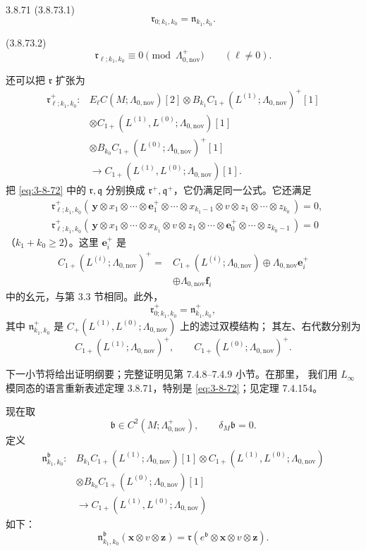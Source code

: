 \begin{theorem}{3.8.71}
\noindent\textup{(3.8.73.1)}
\[
 \mathfrak r_{0;k_1,k_0}=\mathfrak n_{k_1,k_0}.
\]

\noindent\textup{(3.8.73.2)}
\[
 \mathfrak r_{\ell;k_1,k_0}
 \equiv0\pmod{\Lambda^+_{0,\mathrm{nov}}}
 \qquad(\ell\ne0).
\]

还可以把 $\mathfrak r$ 扩张为
\[
\begin{aligned}
 \mathfrak r^+_{\ell;k_1,k_0}\colon&
 E_\ell C(M;\Lambda_{0,\mathrm{nov}})[2]
 \otimes
 B_{k_1}C_{1+}(L^{(1)};\Lambda_{0,\mathrm{nov}})^+[1]\\
 &\otimes
 C_{1+}(L^{(1)},L^{(0)};\Lambda_{0,\mathrm{nov}})[1]\\
 &\otimes
 B_{k_0}C_{1+}(L^{(0)};\Lambda_{0,\mathrm{nov}})^+[1]\\
 &\longrightarrow
 C_{1+}(L^{(1)},L^{(0)};\Lambda_{0,\mathrm{nov}})[1].
\end{aligned}
\]
把 \eqref{eq:3-8-72} 中的 $\mathfrak r,\mathfrak q$ 分别换成
$\mathfrak r^+,\mathfrak q^+$，它仍满足同一公式。它还满足
\[
\begin{aligned}
 &\mathfrak r^+_{\ell;k_1,k_0}
 (\,\mathbf y\otimes x_1\otimes\cdots\otimes
 \mathbf e_1^+\otimes\cdots\otimes x_{k_1-1}
 \otimes v\otimes z_1\otimes\cdots\otimes z_{k_0}\,)
 =0,\\
 &\mathfrak r^+_{\ell;k_1,k_0}
 (\,\mathbf y\otimes x_1\otimes\cdots\otimes x_{k_1}
 \otimes v\otimes z_1\otimes\cdots\otimes
 \mathbf e_0^+\otimes\cdots\otimes z_{k_0-1}\,)
 =0
\end{aligned}
\]
（$k_1+k_0\geq2$）。这里 $\mathbf e_i^+$ 是
\[
\begin{aligned}
 C_{1+}(L^{(i)};\Lambda_{0,\mathrm{nov}})^+
 ={}&
 C_{1+}(L^{(i)};\Lambda_{0,\mathrm{nov}})
 \oplus\Lambda_{0,\mathrm{nov}}\mathbf e_i^+\\
 &\oplus\Lambda_{0,\mathrm{nov}}\mathbf f_i
\end{aligned}
\]
中的幺元，与第 3.3 节相同。此外，
\[
 \mathfrak r^+_{0;k_1,k_0}
 =
 \mathfrak n^+_{k_1,k_0},
\]
其中 $\mathfrak n^+_{k_1,k_0}$ 是
$C_+(L^{(1)},L^{(0)};\Lambda_{0,\mathrm{nov}})$ 上的滤过双模结构；
其左、右代数分别为
\[
 C_{1+}(L^{(1)};\Lambda_{0,\mathrm{nov}})^+,
 \qquad
 C_{1+}(L^{(0)};\Lambda_{0,\mathrm{nov}})^+.
\]
\end{theorem}

下一小节将给出证明纲要；完整证明见第 7.4.8--7.4.9 小节。在那里，
我们用 $L_\infty$ 模同态的语言重新表述定理 3.8.71，特别是
\eqref{eq:3-8-72}；见定理 7.4.154。

现在取
\[
 \mathfrak b\in C^2(M;\Lambda^+_{0,\mathrm{nov}}),
 \qquad
 \delta_M\mathfrak b=0.
\]
定义
\[
\begin{aligned}
 \mathfrak n^{\mathfrak b}_{k_1,k_0}\colon&
 B_{k_1}C_{1+}(L^{(1)};\Lambda_{0,\mathrm{nov}})[1]
 \otimes C_{1+}(L^{(1)},L^{(0)};\Lambda_{0,\mathrm{nov}})\\
 &\otimes
 B_{k_0}C_{1+}(L^{(0)};\Lambda_{0,\mathrm{nov}})[1]\\
 &\longrightarrow
 C_{1+}(L^{(1)},L^{(0)};\Lambda_{0,\mathrm{nov}})
\end{aligned}
\]
如下：
\[
 \mathfrak n^{\mathfrak b}_{k_1,k_0}
 (\mathbf x\otimes v\otimes\mathbf z)
 =
 \mathfrak r(
 e^{\mathfrak b}\otimes\mathbf x\otimes v\otimes\mathbf z
 ).
\]

